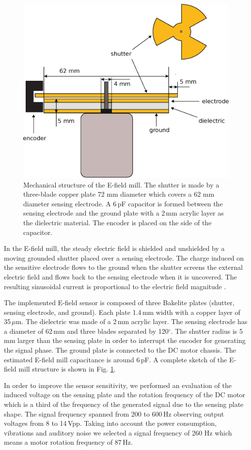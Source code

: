 \documentclass[letterpaper,12pt]{article}
\begin{document}
\begin{figure}[h]
\begin{center}
\includegraphics[width=.45\textwidth]{Figures/Emill.eps}
\caption{\label{emill} Mechanical structure of the E-field mill. The shutter is made by a three-blade copper plate 72 mm diameter which covers a 62 mm diameter sensing electrode. A 6\,pF capacitor is formed between the sensing electrode and the ground plate with a 2\,mm acrylic layer as the dielectric material. The encoder is placed on the side of the capacitor.}
\end{center}
\end{figure}

In the E-field mill, the steady electric field is shielded and unshielded by a moving grounded shutter placed over a sensing electrode. The charge induced on the sensitive electrode flows to the ground when the shutter screens the external electric field and flows back to the sensing electrode when it is uncovered. The resulting sinusoidal current is proportional to the electric field magnitude \cite{Rakov2016}.  

The implemented E-field sensor is composed of three Bakelite plates (shutter, sensing electrode, and ground). Each plate 1.4\,mm width with a copper layer of 35\,$\mu$m. The dielectric was made of a 2\,mm acrylic layer. The sensing electrode has a diameter of 62\,mm and three blades separated by 120$^{\circ}$. The shutter radius is 5\,mm larger than the sensing plate in order to interrupt the encoder for generating the signal phase. The ground plate is connected to the DC motor chassis. The estimated E-field mill capacitance is around 6\,pF. A complete sketch of the E-field mill structure is shown in Fig. \ref{emill}.

In order to improve the sensor sensitivity, we performed an evaluation of the induced voltage on the sensing plate and the rotation frequency of the DC motor which is a third of the frequency of the generated signal due to the sensing plate shape. The signal frequency spanned from 200 to 600\,Hz observing output voltages from 8 to 14\,Vpp. Taking into account the power consumption, vibrations and auditory noise we selected a signal frequency of 260 Hz which means a motor rotation frequency of 87\,Hz. 
\end{document}

